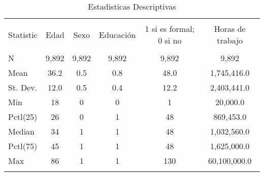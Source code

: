 
\begin{table}[!htbp] \centering 
  \caption{Estadisticas Descriptivas} 
  \label{} 
\begin{tabular}{@{\extracolsep{5pt}}lccccc} 
\\[-1.8ex]\hline 
\hline \\[-1.8ex] 
Statistic & Edad & Sexo & Educación & 1 si es formal; 0 si no & Horas de trabajo \\ 
\hline \\[-1.8ex] 
N & 9,892 & 9,892 & 9,892 & 9,892 & 9,892 \\ 
Mean & 36.2 & 0.5 & 0.8 & 48.0 & 1,745,416.0 \\ 
St. Dev. & 12.0 & 0.5 & 0.4 & 12.2 & 2,403,441.0 \\ 
Min & 18 & 0 & 0 & 1 & 20,000.0 \\ 
Pctl(25) & 26 & 0 & 1 & 48 & 869,453.0 \\ 
Median & 34 & 1 & 1 & 48 & 1,032,560.0 \\ 
Pctl(75) & 45 & 1 & 1 & 48 & 1,625,000.0 \\ 
Max & 86 & 1 & 1 & 130 & 60,100,000.0 \\ 
\hline \\[-1.8ex] 
\end{tabular} 
\end{table} 
